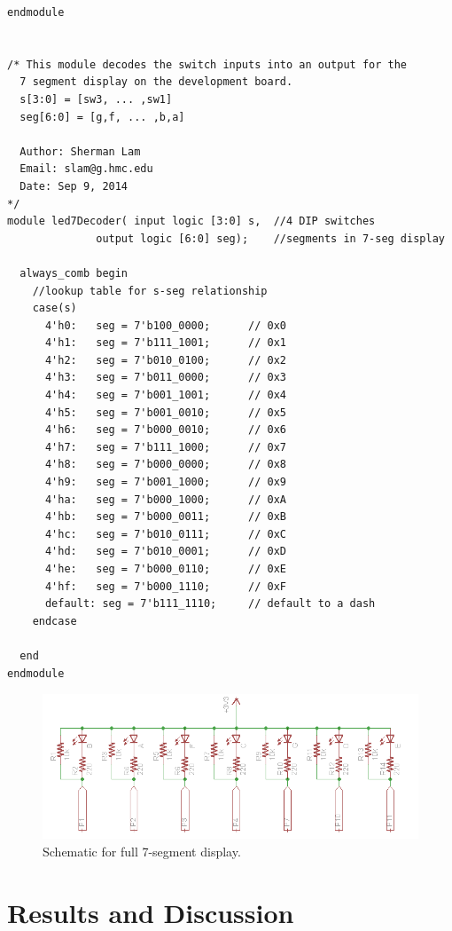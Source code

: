 \documentclass[11pt]{article}
\begin{document}
\begin{verbatim}
endmodule


/* This module decodes the switch inputs into an output for the 
  7 segment display on the development board.
  s[3:0] = [sw3, ... ,sw1]
  seg[6:0] = [g,f, ... ,b,a]
  
  Author: Sherman Lam
  Email: slam@g.hmc.edu
  Date: Sep 9, 2014
*/
module led7Decoder( input logic [3:0] s,  //4 DIP switches
              output logic [6:0] seg);    //segments in 7-seg display
              
  always_comb begin
    //lookup table for s-seg relationship
    case(s)
      4'h0:   seg = 7'b100_0000;      // 0x0
      4'h1:   seg = 7'b111_1001;      // 0x1
      4'h2:   seg = 7'b010_0100;      // 0x2
      4'h3:   seg = 7'b011_0000;      // 0x3
      4'h4:   seg = 7'b001_1001;      // 0x4
      4'h5:   seg = 7'b001_0010;      // 0x5
      4'h6:   seg = 7'b000_0010;      // 0x6
      4'h7:   seg = 7'b111_1000;      // 0x7
      4'h8:   seg = 7'b000_0000;      // 0x8
      4'h9:   seg = 7'b001_1000;      // 0x9
      4'ha:   seg = 7'b000_1000;      // 0xA
      4'hb:   seg = 7'b000_0011;      // 0xB
      4'hc:   seg = 7'b010_0111;      // 0xC
      4'hd:   seg = 7'b010_0001;      // 0xD
      4'he:   seg = 7'b000_0110;      // 0xE
      4'hf:   seg = 7'b000_1110;      // 0xF
      default: seg = 7'b111_1110;     // default to a dash
    endcase
   
  end
endmodule

\end{verbatim}


\begin{figure}[h!]
\centering
\includegraphics[scale=0.8]{seven_segment.png}
\caption{Schematic for full 7-segment display.}
\label{figure:seven_segment}
\end{figure} 


\section{Results and Discussion}
\end{document}
